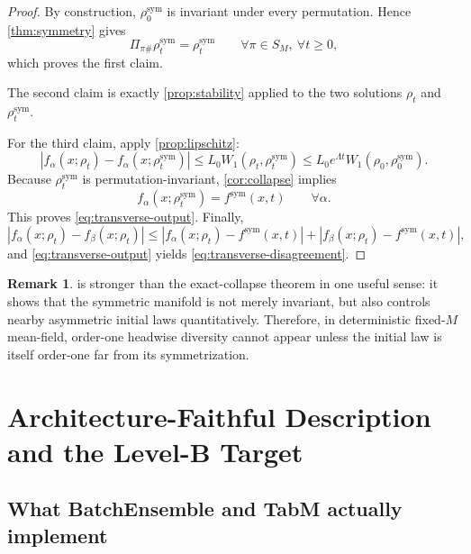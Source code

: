 \documentclass[11pt]{article}
\theoremstyle{definition}
\newtheorem{remark}[theorem]{Remark}
\newcommand{\W}{W_1}
\begin{document}
\begin{proof}
By construction, $\rho_0^{\mathrm{sym}}$ is invariant under every permutation.
Hence \cref{thm:symmetry} gives
\[
  \Pi_{\pi\#}\rho_t^{\mathrm{sym}}=\rho_t^{\mathrm{sym}}
  \qquad
  \forall \pi\in S_M,\ \forall t\ge 0,
\]
which proves the first claim.

The second claim is exactly \cref{prop:stability} applied to the two solutions
$\rho_t$ and $\rho_t^{\mathrm{sym}}$.

For the third claim, apply \cref{prop:lipschitz}:
\[
  |f_\alpha(x;\rho_t)-f_\alpha(x;\rho_t^{\mathrm{sym}})|
  \le
  L_0 \W(\rho_t,\rho_t^{\mathrm{sym}})
  \le
  L_0 e^{\Lambda t}\W(\rho_0,\rho_0^{\mathrm{sym}}).
\]
Because $\rho_t^{\mathrm{sym}}$ is permutation-invariant, \cref{cor:collapse} implies
\[
  f_\alpha(x;\rho_t^{\mathrm{sym}})
  =
  f^{\mathrm{sym}}(x,t)
  \qquad
  \forall \alpha.
\]
This proves \eqref{eq:transverse-output}.
Finally,
\[
  |f_\alpha(x;\rho_t)-f_\beta(x;\rho_t)|
  \le
  |f_\alpha(x;\rho_t)-f^{\mathrm{sym}}(x,t)|
  +
  |f_\beta(x;\rho_t)-f^{\mathrm{sym}}(x,t)|,
\]
and \eqref{eq:transverse-output} yields \eqref{eq:transverse-disagreement}.
\end{proof}

\begin{remark}
 is stronger than the exact-collapse theorem in one useful sense:
it shows that the symmetric manifold is not merely invariant,
but also controls nearby asymmetric initial laws quantitatively.
Therefore, in deterministic fixed-$M$ mean-field,
order-one headwise diversity cannot appear unless the initial law is itself order-one far from its symmetrization.
\end{remark}

\section{Architecture-Faithful Description and the Level-B Target}

\subsection{What BatchEnsemble and TabM actually implement}
\end{document}
